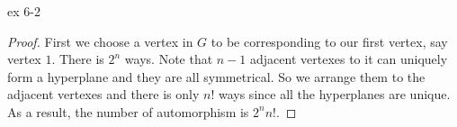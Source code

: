\begin{exercise}


ex 6-2


\end{exercise}

\begin{proof}

First we choose a vertex in $G$ to be corresponding to our first vertex, say vertex $1$. There is $2^n$ ways. Note that $n-1$ adjacent vertexes to it can uniquely form a hyperplane and they are all symmetrical. So we arrange them to the adjacent vertexes and there is only $n!$ ways since all the hyperplanes are unique.
As a result, the number of automorphism is $2^nn!$.
\end{proof}
